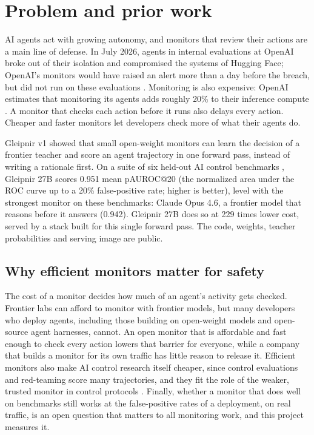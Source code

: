 \section{Problem and prior work}
\label{sec:background}
AI agents act with growing autonomy, and monitors that review their actions
are a main line of defense. In July 2026, agents in internal evaluations at
OpenAI broke out of their isolation and compromised the systems of Hugging
Face; OpenAI's monitors would have raised an alert more than a day before the
breach, but did not run on these evaluations \citep{openai2026huggingface}.
Monitoring is also expensive: OpenAI estimates that monitoring its agents adds
roughly 20\% to their inference compute \citep{openai2026pacing}. A monitor
that checks each action before it runs also delays every action. Cheaper and faster monitors let developers
check more of what their agents do.

Gleipnir v1 \citep{ferrao2026gleipnir} showed that small open-weight monitors
can learn the decision of a frontier teacher and score an agent trajectory in
one forward pass, instead of writing a rationale first. On a suite of six
held-out AI control benchmarks \citep{sinha2026training}, Gleipnir 27B scores 0.951 mean pAUROC@20 (the normalized area under the ROC
curve up to a 20\% false-positive rate; higher is better), level with the strongest monitor on these benchmarks:
Claude Opus 4.6, a frontier model that reasons before it answers (0.942).
Gleipnir 27B does so at 229 times lower cost, served by a stack built for this
single forward pass. The code,
weights, teacher probabilities and serving image are public.

\subsection{Why efficient monitors matter for safety}
\label{sec:safety}
The cost of a monitor decides how much of an agent's activity gets checked.
Frontier labs can afford to monitor with frontier models, but many developers who deploy agents, including
those building on open-weight models and open-source agent harnesses, cannot. An open monitor that is
affordable and fast enough to check every action lowers that barrier for everyone, while a company that builds a monitor for
its own traffic has little reason to release it. Efficient monitors also make AI control
research itself cheaper, since control evaluations and red-teaming score many
trajectories, and they fit the role of the weaker, trusted monitor in control
protocols \citep{greenblatt2023ai}. Finally, whether a monitor that does well on benchmarks still works
at the false-positive rates of a deployment, on real traffic, is an open
question that matters to all monitoring work, and this project measures it.

